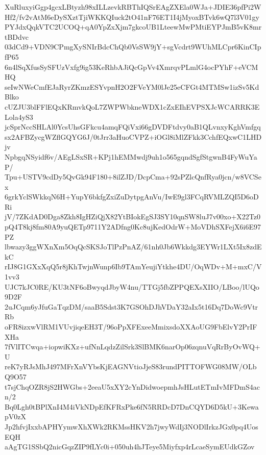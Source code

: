 XuRluxyiGgp4gcxLBtyzh98xILLzevkRBThIQSrEAgZXEla0WJa+JDIE36pfPi2W
Hf2/fv2vAtM6eDySXztTjiWKKQIuck2tO41nF76ET1I4jMyoxBTvk6wQ7l3V01gy
PYJdxQqkVTC2UCOQ+qA0YpZxXjm7gkcoUB1LteewMwPMtiEYPJmB5vK8mrtBDdvc
03dCd9+VDN9CPmgXySNIrBdcChQb0VsSW9jY+sgVcdrt9WUhMLCpr6KinCIpfP65
6n4lSqXfusSySFUzVxfg9ig53KeRhbAJiQcGpVv4XmrqvPLmlG4ocPYhF+eVCMHQ
seIwNWeCmfEJaRyrZKmzESYvpnH2O2FVeYM0lJe25eCFGt4MTMSw1izSv5KdBlko
cUZJU3blFFlEQxKRmvkQoL7ZWPWbkneWDX1cZxEIhEVPSXJcWCARRK3ELola4yS3
jcSprNccSHLAl0YcsUhsGFkcu4amqFQiVxi66gDVDFtdvy0aB1QLvnxyKghVmfgq
sx2AFBZycgWZflGQYG6J/0tJrr3aHuoCVPZ+iOGl8iMlZFkk3CchfEQxwC1LHDjv
NpbgqNSyidf6v/AEgLSxSR+KPj1hEMMwdj9uh1o565gqndSgfStgwnB4FyWuYaP/
Tpu+USTV9cdDy5QvGk94F180+8ilZJD/DcpCma+92sPZlcQnfRya0jcn/w8VCSex
6grkYclSWkkqN6H+YupY6bkfgZxiZuDytpgAnVu/IwE9gl3FCqRVMLZQI5D6oDRi
jV/7ZKdAD0Dga8Zkh8IgHZiQjX82YtBIokEgSJ3SY10qnSW8luJ7v00xo+X22Tz0
pQ4T8kj8fm80A9yuQETp9711Y2ADfng0Kc8ujKedOdrW+MoVDhSXFejX6i6E97PZ
lbwazy3ggWXnXm5OqQcSKSJoTlPzPnAZ/61nh0Jb6Wkkdg3EYWr1LXt5Ix8zdEkC
rIJ8G1GXxXqQ5r8jKhTwjnWunp6Ib9TAmYeujiYtkhe4DU/OqWDv+M+mxC/V1vv3
UJC7kJC0RE/KU3tNF6oBwyqdJbyW4nu/TTGj5fbZPPQEXsXIIO/LBoo/lUQo9D2F
2uJCqm6yJfuGaTqzDM/saaB5Sdst3K7GSOhDJhVDaY32aIx5t16Dq7DoWc9VtrRb
oFR8izxwVlRM1VUvjiqeEH3T/96oPpXFExeeMmixsdoXXAoUG9FbElvY2PrIFXHa
7fVlITCwqa+iopwiKXz+ufNnLqdzZilSrk3SlBMK6narOp06zqnuVqRrByOvWQ+U
reK7yRJsMhJ497MFrXnVYbsKjEAGNVtioJjeS83rundPITTOFWG08MW/OLbQ9O57
t7sjChqOZR8jS2HWGbs+2eeaU5xXY2cYnDidwoepmhJsHLutETmIvMFDmS4acn/2
Bq0Lgh0tBPlXnI4M4iVkNDpEfKFRxPke6fN5RRDcD7DnCQYD6D5kU+3KewapV0zX
Jp2hfvjIxxbAPHYymwXhXWk2RKMssHKV2h7jwyWdIj3NODlIrkzJGx0pq4UosEQH
aAgTG1SSbQ2nicGqzZIP9fLYc0i+050uh4hJTeye5Miyfxp4rLcaeSymEUdkGZov
